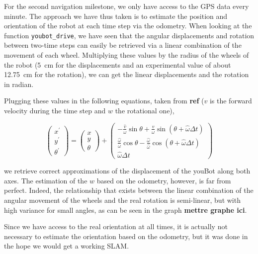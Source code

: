 \documentclass[a4paper, 10pt, conference]{ieeeconf}
\begin{document}
    For the second navigation milestone, we only have access to the GPS data every minute. The approach we have thus taken is to estimate the position and orientation of the robot at each time step via the odometry. When looking at the function \texttt{youbot\_drive}, we have seen that the angular displacements and rotation between two-time steps can easily be retrieved via a linear combination of the movement of each wheel. Multiplying these values by the radius of the wheels of the robot (\SI{5}{\centi\meter} for the displacements and an experimental value of about \SI{12.75}{\centi\meter} for the rotation), we can get the linear displacements and the rotation in radian.
    
    Plugging these values in the following equations, taken from \textbf{ref} ($v$ is the forward velocity during the time step and $w$ the rotational one),

    \begin{equation*}
        \left(\begin{array}{l}
            x^{\prime} \\ y^{\prime} \\ \theta^{\prime}
        \end{array}\right)
        =
        \left(\begin{array}{l}
            x \\ y \\ \theta
        \end{array}\right)
        +
        \left(\begin{array}{c}
            -\frac{\hat{v}}{\omega} \sin \theta+\frac{\hat{v}}{\omega} \sin (\theta+\hat{\omega} \Delta t) \\ \frac{\hat{\omega}}{\omega} \cos \theta-\frac{\hat{\omega}}{\hat{\omega}} \cos (\theta+\hat{\omega} \Delta t) \\ \hat{\omega} \Delta t
        \end{array}\right)
    \end{equation*}

    we retrieve correct approximations of the displacement of the youBot along both axes. The estimation of the $w$ based on the odometry, however, is far from perfect. Indeed, the relationship that exists between the linear combination of the angular movement of the wheels and the real rotation is semi-linear, but with high variance for small angles, as can be seen in the graph \textbf{mettre graphe ici}. 
    
    Since we have access to the real orientation at all times, it is actually not necessary to estimate the orientation based on the odometry, but it was done in the hope we would get a working SLAM.
    
\end{document}
